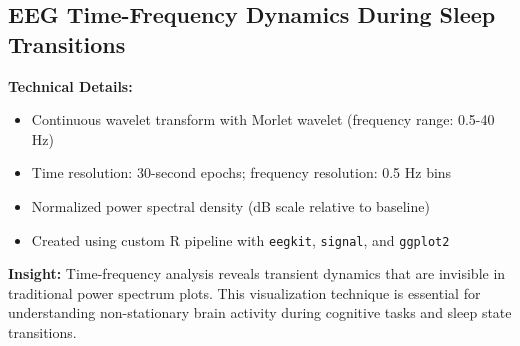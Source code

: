 
\subsection*{EEG Time-Frequency Dynamics During Sleep Transitions}


\textbf{Technical Details:}
\begin{itemize}[leftmargin=1.2em, itemsep=0.1em]
  \item Continuous wavelet transform with Morlet wavelet (frequency range: 0.5-40 Hz)
  \item Time resolution: 30-second epochs; frequency resolution: 0.5 Hz bins
  \item Normalized power spectral density (dB scale relative to baseline)
  \item Created using custom R pipeline with \texttt{eegkit}, \texttt{signal}, and \texttt{ggplot2}
\end{itemize}

\textbf{Insight:} Time-frequency analysis reveals transient dynamics that are invisible in traditional power spectrum plots. This visualization technique is essential for understanding non-stationary brain activity during cognitive tasks and sleep state transitions.


